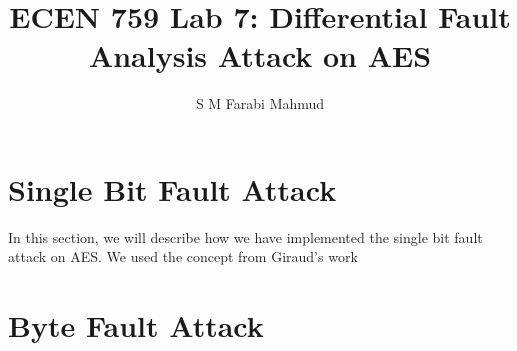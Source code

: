 \documentclass{article}
\title{ECEN 759 Lab 7: Differential Fault Analysis Attack on AES}
\author{S M Farabi Mahmud}
\begin{document}
\maketitle
\section{Single Bit Fault Attack}
In this section, we will describe how we have implemented the single bit fault attack on AES. We used the concept from Giraud's work~\cite{giraud2004dfa}
\section{Byte Fault Attack}



\end{document}
